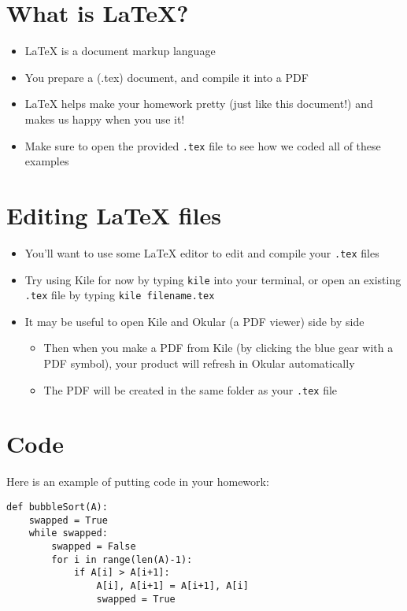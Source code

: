 \documentclass[11pt]{article}			%
\begin{document}
\centerline{\bf \LARGE\hw}

\section{What is LaTeX?}

\begin{itemize}
	\item LaTeX is a document markup language
	\item You prepare a (.tex) document, and compile it into a PDF
	\item LaTeX helps make your homework pretty (just like this document!) and makes us happy when you use it!
	\item Make sure to open the provided \verb|.tex| file to see how we coded all of these examples
\end{itemize}

\section{Editing LaTeX files}
\begin{itemize}
	\item You'll want to use some LaTeX editor to edit and compile your \verb|.tex| files
	\item Try using Kile for now by typing \verb|kile| into your terminal, or open an existing \verb|.tex| file by typing \verb|kile filename.tex|
	\item It may be useful to open Kile and Okular (a PDF viewer) side by side
		\begin{itemize}
		 \item Then when you make a PDF from Kile (by clicking the blue gear with a PDF symbol), your product will refresh in Okular automatically
		\item The PDF will be created in the same folder as your \verb|.tex| file
		\end{itemize}

\end{itemize}


\section{Code}
Here is an example of putting code in your homework:
\begin{verbatim}
def bubbleSort(A):
    swapped = True
    while swapped:
        swapped = False
        for i in range(len(A)-1):
            if A[i] > A[i+1]:
                A[i], A[i+1] = A[i+1], A[i]
                swapped = True
\end{verbatim}
\end{document}
